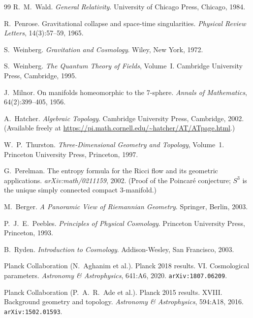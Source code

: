 \documentclass[12pt,a4paper]{article}
\theoremstyle{definition}
\begin{document}
\begin{thebibliography}{99}
R.~M.~Wald.
\newblock \emph{General Relativity}.
\newblock University of Chicago Press, Chicago, 1984.

R.~Penrose.
\newblock Gravitational collapse and space-time singularities.
\newblock \emph{Physical Review Letters}, 14(3):57--59, 1965.

S.~Weinberg.
\newblock \emph{Gravitation and Cosmology}.
\newblock Wiley, New York, 1972.

S.~Weinberg.
\newblock \emph{The Quantum Theory of Fields}, Volume~I.
\newblock Cambridge University Press, Cambridge, 1995.

J.~Milnor.
\newblock On manifolds homeomorphic to the 7-sphere.
\newblock \emph{Annals of Mathematics}, 64(2):399--405, 1956.

A.~Hatcher.
\newblock \emph{Algebraic Topology}.
\newblock Cambridge University Press, Cambridge, 2002.
\newblock (Available freely at \url{https://pi.math.cornell.edu/~hatcher/AT/ATpage.html}.)

W.~P.~Thurston.
\newblock \emph{Three-Dimensional Geometry and Topology}, Volume~1.
\newblock Princeton University Press, Princeton, 1997.

G.~Perelman.
\newblock The entropy formula for the Ricci flow and its geometric applications.
\newblock \emph{arXiv:math/0211159}, 2002.
\newblock (Proof of the Poincar\'{e} conjecture; $S^3$ is the unique simply connected compact 3-manifold.)

M.~Berger.
\newblock \emph{A Panoramic View of Riemannian Geometry}.
\newblock Springer, Berlin, 2003.

P.~J.~E.~Peebles.
\newblock \emph{Principles of Physical Cosmology}.
\newblock Princeton University Press, Princeton, 1993.

B.~Ryden.
\newblock \emph{Introduction to Cosmology}.
\newblock Addison-Wesley, San Francisco, 2003.

Planck Collaboration (N.~Aghanim et al.).
\newblock Planck 2018 results. VI. Cosmological parameters.
\newblock \emph{Astronomy \& Astrophysics}, 641:A6, 2020.
\newblock \texttt{arXiv:1807.06209}.

Planck Collaboration (P.~A.~R.~Ade et al.).
\newblock Planck 2015 results. XVIII. Background geometry and topology.
\newblock \emph{Astronomy \& Astrophysics}, 594:A18, 2016.
\newblock \texttt{arXiv:1502.01593}.


\end{thebibliography}
\end{document}
